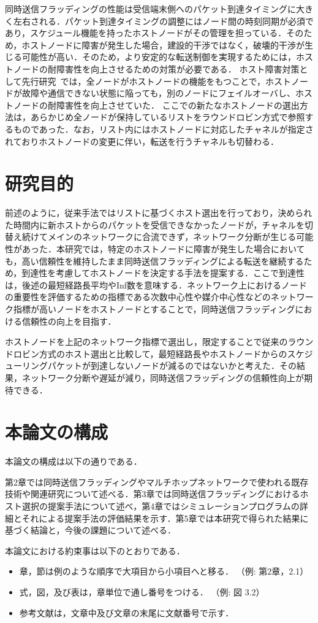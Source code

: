 同時送信フラッディングの性能は受信端末側へのパケット到達タイミングに大きく左右される．パケット到達タイミングの調整にはノード間の時刻同期が必須であり，スケジュール機能を持ったホストノードがその管理を担っている．そのため，ホストノードに障害が発生した場合，建設的干渉ではなく，破壊的干渉が生じる可能性が高い．そのため，より安定的な転送制御を実現するためには，ホストノードの耐障害性を向上させるための対策が必要である．
ホスト障害対策として先行研究~\cite{lowpower}では，全ノードがホストノードの機能をもつことで，ホストノードが故障や通信できない状態に陥っても，別のノードにフェイルオーバし、ホストノードの耐障害性を向上させていた．
ここでの新たなホストノードの選出方法は，あらかじめ全ノードが保持しているリストをラウンドロビン方式で参照するものであった．なお，リスト内にはホストノードに対応したチャネルが指定されておりホストノードの変更に伴い，転送を行うチャネルも切替わる．

\section{研究目的}
前述のように，従来手法ではリストに基づくホスト選出を行っており，決められた時間内に新ホストからのパケットを受信できなかったノードが，チャネルを切替え続けてメインのネットワークに合流できず，ネットワーク分断が生じる可能性があった．本研究では，特定のホストノードに障害が発生した場合においても，高い信頼性を維持したまま同時送信フラッディングによる転送を継続するため，到達性を考慮してホストノードを決定する手法を提案する．ここで到達性は，後述の最短経路長平均やInf数を意味する．ネットワーク上におけるノードの重要性を評価するための指標である次数中心性や媒介中心性などのネットワーク指標が高いノードをホストノードとすることで，同時送信フラッディングにおける信頼性の向上を目指す．%

ホストノードを上記のネットワーク指標で選出し，限定することで従来のラウンドロビン方式のホスト選出と比較して，最短経路長やホストノードからのスケジューリングパケットが到達しないノードが減るのではないかと考えた．その結果，ネットワーク分断や遅延が減り，同時送信フラッディングの信頼性向上が期待できる．

\section{本論文の構成}
本論文の構成は以下の通りである．

第2章では同時送信フラッディングやマルチホップネットワークで使われる既存技術や関連研究について述べる．第3章では同時送信フラッディングにおけるホスト選択の提案手法について述べ，第4章ではシミュレーションプログラムの詳細とそれによる提案手法の評価結果を示す．第5章では本研究で得られた結果に基づく結論と，今後の課題について述べる．

本論文における約束事は以下のとおりである．
\begin{itemize}
    \item 章，節は例のような順序で大項目から小項目へと移る． （例: 第2章，2.1）
    \item 式，図，及び表は，章単位で通し番号をつける． （例: 図 3.2）
    \item 参考文献は，文章中及び文章の末尾に文献番号で示す．
\end{itemize}
